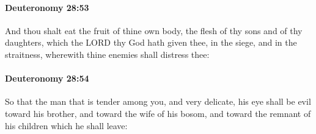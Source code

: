 		\paragraph{Deuteronomy 28:53} %
			\label{DEUTERONOMY-28-53}

			And thou shalt eat the fruit of thine own body, the flesh of thy sons and of thy daughters, which the LORD thy God hath given thee, in the siege, and in the straitness, wherewith thine enemies shall distress thee:


		\paragraph{Deuteronomy 28:54} %
			\label{DEUTERONOMY-28-54}

			So that the man that is tender among you, and very delicate, his eye shall be evil toward his brother, and toward the wife of his bosom, and toward the remnant of his children which he shall leave:

